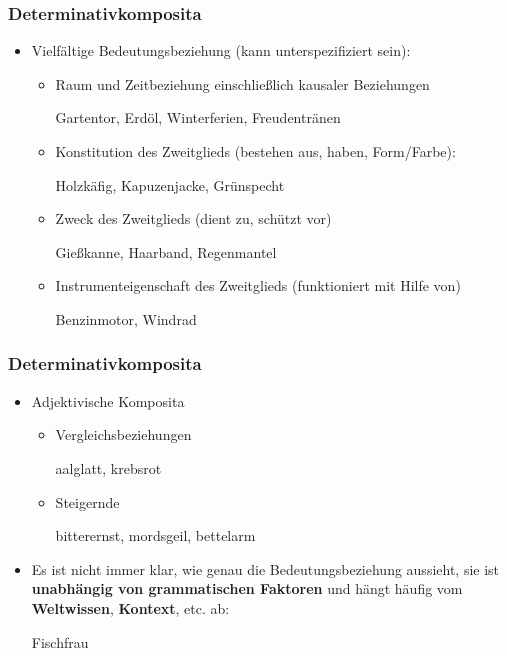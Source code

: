 
\begin{frame}
\frametitle{Determinativkomposita}

\begin{itemize}
	\item Vielfältige Bedeutungsbeziehung (kann unterspezifiziert sein):
		\begin{itemize}
		
			\item Raum und Zeitbeziehung einschließlich kausaler Beziehungen
			
			\ea Gartentor, Erdöl, Winterferien, Freudentränen
			\z
			
			\item Konstitution des Zweitglieds (bestehen aus, haben, Form/Farbe):
			
			\ea Holzkäfig, Kapuzenjacke, Grünspecht
			\z
			
			\item Zweck des Zweitglieds (dient zu, schützt vor)
			
			\ea Gießkanne, Haarband, Regenmantel
			\z
			
			\item Instrumenteigenschaft des Zweitglieds (funktioniert mit Hilfe von)
			
			\ea Benzinmotor, Windrad
			\z
			
		\end{itemize}
	
\end{itemize}

\end{frame}

\begin{frame}
\frametitle{Determinativkomposita}

\begin{itemize}
	\item Adjektivische Komposita
	
	\begin{itemize}
		\item Vergleichsbeziehungen
		
		\ea aalglatt, krebsrot
		\z
		
		\item Steigernde
		
		\ea bitterernst, mordsgeil, bettelarm
		\z
		
	\end{itemize}
	
	\item Es ist nicht immer klar, wie genau die Bedeutungsbeziehung aussieht, sie ist \textbf{unabhängig von grammatischen Faktoren} und hängt häufig vom \textbf{Weltwissen}, \textbf{Kontext}, etc. ab:
	
	\ea Fischfrau
	\z
	
\end{itemize}


\end{frame}



